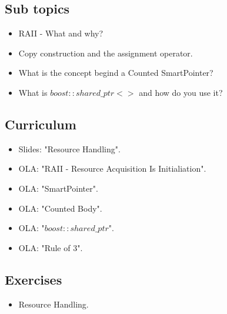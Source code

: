 \subsection{Sub topics}

\begin{itemize}
	\item RAII - What and why?
	\item Copy construction and the assignment operator.
	\item What is the concept begind a Counted SmartPointer?
	\item What is $boost::shared\_ptr<>$ and how do you use it?
\end{itemize}

\subsection{Curriculum}

\begin{itemize}
	\item Slides: "Resource Handling".
	\item OLA: "RAII - Resource Acquisition Is Initialiation".
	\item OLA: "SmartPointer".
	\item OLA: "Counted Body".
	\item OLA: "$boost::shared\_ptr$".
	\item OLA: "Rule of 3".
\end{itemize}

\subsection{Exercises}

\begin{itemize}
	\item Resource Handling.
\end{itemize}